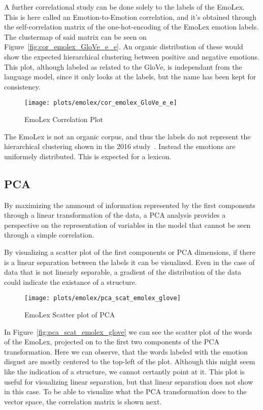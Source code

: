 A further correlational study can be done solely to the labels of the EmoLex. This is here called an Emotion-to-Emotion correlation, and it's obtained through the self-correlation matrix of the one-hot-encoding of the EmoLex emotion labels. The clustermap of said matrix can be seen on Figure~\ref{fig:cor_emolex_GloVe_e_e}. An organic distribution of these would show the expected hierarchical clustering between positive and negative emotions. This plot, although labeled as related to the GloVe, is independant from the language model, since it only looks at the labels, but the name has been kept for consistency.

\begin{figure}[H]
  \texttt{[image: plots/emolex/cor\_emolex\_GloVe\_e\_e]}
  \centering
  \caption{EmoLex Correlation Plot}
\end{figure}\label{fig:cor_emolex_GloVe_e_e}

The EmoLex is not an organic corpus, and thus the labels do not represent the hierarchical clustering shown in the 2016 study~\cite{barradas2016thesis}. Instead the emotions are uniformely distributed. This is expected for a lexicon.

\subsection{PCA}
By maximizing the ammount of information represented by the first components through a linear transformation of the data, a PCA analysis provides a perspective on the representation of variables in the model that cannot be seen through a simple correlation.

By visualizing a scatter plot of the first components or PCA dimensions, if there is a linear separation between the labels it can be visualized. Even in the case of data that is not linearly separable, a gradient of the distribution of the data could indicate the existance of a structure.

\begin{figure}[H]
  \texttt{[image: plots/emolex/pca\_scat\_emolex\_glove]}
  \centering
  \caption{EmoLex Scatter plot of PCA}
\end{figure}\label{fig:pca_scat_emolex_glove}

In Figure~\ref{fig:pca_scat_emolex_glove} we can see the scatter plot of the words of the EmoLex, projected on to the first two components of the PCA transformation. Here we can observe, that the words labeled with the emotion disgust are mostly centered to the top-left of the plot. Although this might seem like the indication of a structure, we cannot certantly point at it. This plot is useful for visualizing linear separation, but that linear separation does not show in this case. To be able to visualize what the PCA transformation does to the vector space, the correlation matrix is shown next.

